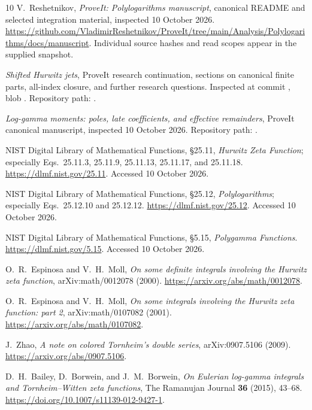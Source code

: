 \begin{thebibliography}{10}
V.~Reshetnikov, \emph{ProveIt: Polylogarithms manuscript}, canonical README
and selected integration material, inspected 10 October 2026.
\url{https://github.com/VladimirReshetnikov/ProveIt/tree/main/Analysis/Polylogarithms/docs/manuscript}.
Individual source hashes and read scopes appear in the supplied snapshot.

\emph{Shifted Hurwitz jets}, ProveIt research continuation, sections on
canonical finite parts, all-index closure, and further research questions.
Inspected at commit ,
blob .
Repository path:
.

\emph{Log-gamma moments: poles, late coefficients, and effective remainders},
ProveIt canonical manuscript, inspected 10 October 2026.
Repository path:
.

NIST Digital Library of Mathematical Functions,
\S25.11, \emph{Hurwitz Zeta Function}; especially Eqs.~25.11.3,
25.11.9, 25.11.13, 25.11.17, and 25.11.18.
\url{https://dlmf.nist.gov/25.11}. Accessed 10 October 2026.

NIST Digital Library of Mathematical Functions,
\S25.12, \emph{Polylogarithms}; especially Eqs.~25.12.10 and 25.12.12.
\url{https://dlmf.nist.gov/25.12}. Accessed 10 October 2026.

NIST Digital Library of Mathematical Functions,
\S5.15, \emph{Polygamma Functions}.
\url{https://dlmf.nist.gov/5.15}. Accessed 10 October 2026.

O.~R.~Espinosa and V.~H.~Moll,
\emph{On some definite integrals involving the Hurwitz zeta function},
arXiv:math/0012078 (2000).
\url{https://arxiv.org/abs/math/0012078}.

O.~R.~Espinosa and V.~H.~Moll,
\emph{On some integrals involving the Hurwitz zeta function: part 2},
arXiv:math/0107082 (2001).
\url{https://arxiv.org/abs/math/0107082}.

J.~Zhao, \emph{A note on colored Tornheim's double series},
arXiv:0907.5106 (2009).
\url{https://arxiv.org/abs/0907.5106}.

D.~H.~Bailey, D.~Borwein, and J.~M.~Borwein,
\emph{On Eulerian log-gamma integrals and Tornheim--Witten zeta functions},
The Ramanujan Journal \textbf{36} (2015), 43--68.
\url{https://doi.org/10.1007/s11139-012-9427-1}.
\end{thebibliography}
